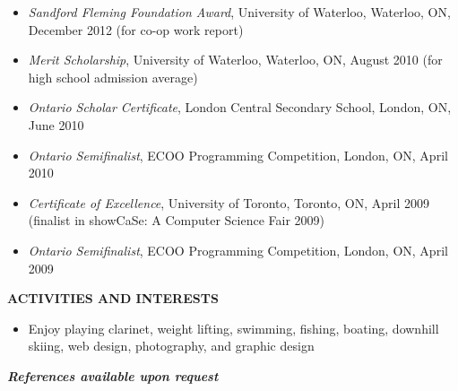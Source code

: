 \documentclass[10pt,letterpaper]{article}
\begin{document}
\begin{adjustwidth}{0.1in}{0.5in}
    \begin{itemize}
	\item \emph{Sandford Fleming Foundation Award}, University of Waterloo, Waterloo, ON, December 2012 
	    (for co-op work report)
	\item \emph{Merit Scholarship}, University of Waterloo, Waterloo, ON, August 2010 
	    (for high school admission average)
	\item \emph{Ontario Scholar Certificate}, London Central Secondary School, London, ON, June 2010
	\item \emph{Ontario Semifinalist}, ECOO Programming Competition, London, ON, April 2010
	\item \emph{Certificate of Excellence}, University of Toronto, Toronto, ON, April 2009 
	    (finalist in showCaSe: A Computer Science Fair 2009)
	\item \emph{Ontario Semifinalist}, ECOO Programming Competition, London, ON, April 2009
    \end{itemize}
\end{adjustwidth}
\vspace{1em}
\textbf{ACTIVITIES AND INTERESTS} \hrulefill \\
\begin{adjustwidth}{0.1in}{0.5in}
    \begin{itemize}
	\item Enjoy playing clarinet, weight lifting, swimming, fishing, boating, downhill skiing, 
	    web design, photography, and graphic design
    \end{itemize}
\end{adjustwidth}
\begin{center}
	\textbf{\textit{References available upon request}}
\end{center}
\end{document}
